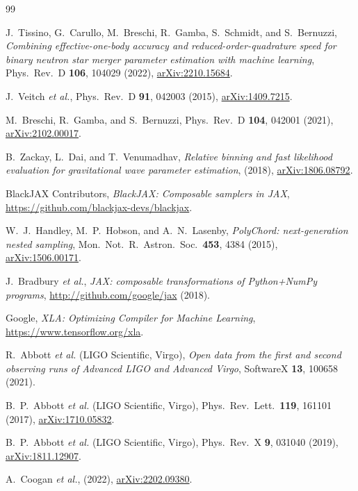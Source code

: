 \documentclass[twocolumn,superscriptaddress,nofootinbib,aps,prd]{revtex4-2}
\begin{document}
\begin{thebibliography}{99}

J.~Tissino, G.~Carullo, M.~Breschi, R.~Gamba, S.~Schmidt, and
S.~Bernuzzi,
\emph{Combining effective-one-body accuracy and reduced-order-quadrature
speed for binary neutron star merger parameter estimation with machine
learning},
Phys.\ Rev.\ D \textbf{106}, 104029 (2022),
\href{https://arxiv.org/abs/2210.15684}{arXiv:2210.15684}.

J.~Veitch \emph{et al.},
Phys.\ Rev.\ D \textbf{91}, 042003 (2015),
\href{https://arxiv.org/abs/1409.7215}{arXiv:1409.7215}.

M.~Breschi, R.~Gamba, and S.~Bernuzzi,
Phys.\ Rev.\ D \textbf{104}, 042001 (2021),
\href{https://arxiv.org/abs/2102.00017}{arXiv:2102.00017}.

B.~Zackay, L.~Dai, and T.~Venumadhav,
\emph{Relative binning and fast likelihood evaluation for gravitational
wave parameter estimation},
(2018),
\href{https://arxiv.org/abs/1806.08792}{arXiv:1806.08792}.

BlackJAX Contributors,
\emph{BlackJAX: Composable samplers in JAX},
\url{https://github.com/blackjax-devs/blackjax}.

W.~J.~Handley, M.~P.~Hobson, and A.~N.~Lasenby,
\emph{PolyChord: next-generation nested sampling},
Mon.\ Not.\ R.\ Astron.\ Soc.\ \textbf{453}, 4384 (2015),
\href{https://arxiv.org/abs/1506.00171}{arXiv:1506.00171}.

J.~Bradbury \emph{et al.},
\emph{JAX: composable transformations of Python+NumPy programs},
\url{http://github.com/google/jax} (2018).

Google,
\emph{XLA: Optimizing Compiler for Machine Learning},
\url{https://www.tensorflow.org/xla}.

R.~Abbott \emph{et al.} (LIGO Scientific, Virgo),
\emph{Open data from the first and second observing runs of Advanced LIGO
and Advanced Virgo},
SoftwareX \textbf{13}, 100658 (2021).

B.~P.~Abbott \emph{et al.} (LIGO Scientific, Virgo),
Phys.\ Rev.\ Lett.\ \textbf{119}, 161101 (2017),
\href{https://arxiv.org/abs/1710.05832}{arXiv:1710.05832}.

B.~P.~Abbott \emph{et al.} (LIGO Scientific, Virgo),
Phys.\ Rev.\ X \textbf{9}, 031040 (2019),
\href{https://arxiv.org/abs/1811.12907}{arXiv:1811.12907}.

A.~Coogan \emph{et al.},
(2022),
\href{https://arxiv.org/abs/2202.09380}{arXiv:2202.09380}.

\end{thebibliography}
\end{document}
